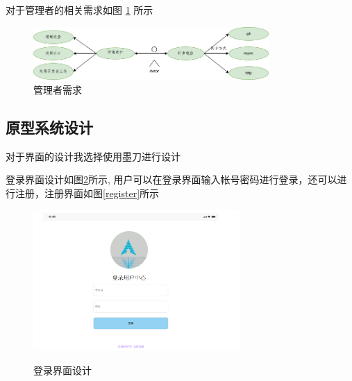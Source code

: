 \documentclass[supercite]{Experimental_Report}
\theoremstyle{definition}
\begin{document}
对于管理者的相关需求如图 \ref{manage} 所示
\begin{figure}[!h]
    \centering
    \includegraphics[width=0.8\textwidth]{images/manager.png}
    \caption{管理者需求}
    \label{manage}
\end{figure}

\subsection{原型系统设计}

对于界面的设计我选择使用墨刀进行设计

登录界面设计如图\ref{login}所示, 用户可以在登录界面输入帐号密码进行登录，还可以进行注册，注册界面如图\ref{register}所示
\begin{figure}[ht]
    \caption{登录界面设计}
    \centering
    \includegraphics[width=0.7\textwidth]{images/login.png}
    \label{login}
\end{figure}
\end{document}
